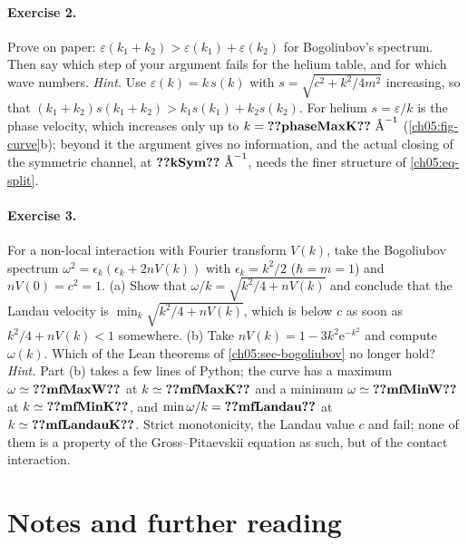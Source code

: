\paragraph{Exercise 2.}
Prove  on paper: $\varepsilon(k_1+k_2)>\varepsilon(k_1)+\varepsilon(k_2)$ for Bogoliubov's spectrum.
Then say which step of your argument fails for the helium table, and for which wave numbers.
\emph{Hint.} Use $\varepsilon(k)=k\,s(k)$ with $s=\sqrt{c^2+k^2/4m^2}$ increasing, so that $(k_1+k_2)s(k_1+k_2)>k_1s(k_1)+k_2s(k_2)$.
For helium $s=\varepsilon/k$ is the phase velocity, which increases only up to $k=\cfiveV{phaseMaxK}\ \cfiveAng^{-1}$ (\cref{ch05:fig-curve}b); beyond it the argument gives no information, and the actual closing of the symmetric channel, at $\cfiveV{kSym}\ \cfiveAng^{-1}$, needs the finer structure of \cref{ch05:eq-split}.

\paragraph{Exercise 3.}
For a non-local interaction with Fourier transform $V(k)$, take the Bogoliubov spectrum $\omega^2=\epsilon_k(\epsilon_k+2nV(k))$ with $\epsilon_k=k^2/2$ ($\hbar=m=1$) and $nV(0)=c^2=1$.
(a) Show that $\omega/k=\sqrt{k^2/4+nV(k)}$ and conclude that the Landau velocity is $\min_k\sqrt{k^2/4+nV(k)}$, which is below $c$ as soon as $k^2/4+nV(k)<1$ somewhere.
(b) Take $nV(k)=1-3k^2\mathrm e^{-k^2}$ and compute $\omega(k)$.
Which of the Lean theorems of \cref{ch05:sec-bogoliubov} no longer hold?
\emph{Hint.} Part (b) takes a few lines of Python; the curve has a maximum $\omega\simeq\cfiveV{mfMaxW}$ at $k\simeq\cfiveV{mfMaxK}$ and a minimum $\omega\simeq\cfiveV{mfMinW}$ at $k\simeq\cfiveV{mfMinK}$, and $\min\omega/k=\cfiveV{mfLandau}$ at $k\simeq\cfiveV{mfLandauK}$.
Strict monotonicity, the Landau value $c$ and  fail; none of them is a property of the Gross--Pitaevskii equation as such, but of the contact interaction.

\section*{Notes and further reading}

